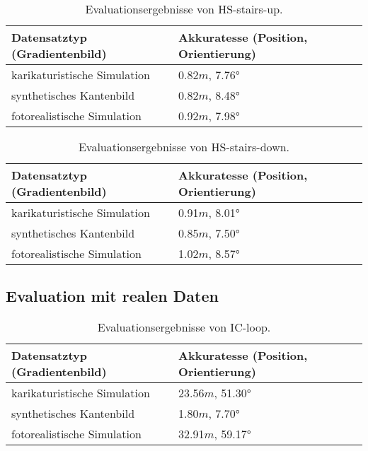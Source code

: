 \begin{table}
	\centering
	\caption{Evaluationsergebnisse von HS-stairs-up.}
	\begin{tabularx}{0.75\textwidth}{X X}\textbf{Datensatztyp} \hspace{2cm} (Gradientenbild)& \textbf{Akkuratesse} \hspace{2cm} (Position, Orientierung)\\
		\hline
		karikaturistische Simulation & 0.82$m$, 7.76°\\
		\hline
		synthetisches Kantenbild & 0.82$m$, 8.48°\\
		\hline
		fotorealistische Simulation & 0.92$m$, 7.98°\\
	\end{tabularx}
	\label{tab:synth_hs_stairs_up}
\end{table}



\begin{table}
	\centering
	\caption{Evaluationsergebnisse von HS-stairs-down.}
	\begin{tabularx}{0.75\textwidth}{X X}\textbf{Datensatztyp} \hspace{2cm} (Gradientenbild)& \textbf{Akkuratesse} \hspace{2cm} (Position, Orientierung)\\
		\hline
		karikaturistische Simulation & 0.91$m$, 8.01°\\
		\hline
		synthetisches Kantenbild & 0.85$m$, 7.50°\\
		\hline
		fotorealistische Simulation & 1.02$m$, 8.57°\\
	\end{tabularx}
	\label{tab:synth_hs_stairs_down}
\end{table}

\cleardoublepage
\subsection{Evaluation mit realen Daten}


\begin{table}
	\centering
	\caption{Evaluationsergebnisse von IC-loop.}
	\begin{tabularx}{0.75\textwidth}{X X}\textbf{Datensatztyp} \hspace{2cm} (Gradientenbild)& \textbf{Akkuratesse} \hspace{2cm} (Position, Orientierung)\\
		\hline
		karikaturistische Simulation & 23.56$m$, 51.30°\\
		\hline
		synthetisches Kantenbild & 1.80$m$, 7.70°\\
		\hline
		fotorealistische Simulation & 32.91$m$, 59.17°\\
	\end{tabularx}
	\label{tab:synth_icloop}
\end{table}


